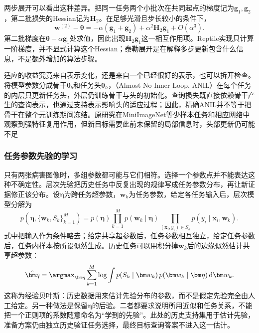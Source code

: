 两步展开可以看出这种差异。把同一任务两个小批次在共同起点的梯度记为$\bm g_1,\bm g_2$，第二批损失的Hessian记为$\bm H_2$。在足够光滑且步长较小的条件下，
\[
  \bm w^{(2)}-\bm{\theta}
    =-\alpha(\bm g_1+\bm g_2)
      +\alpha^2\bm H_2\bm g_1+O(\alpha^3).
\]
第二批梯度在$\bm{\theta}-\alpha\bm g_1$处求值，因此出现$\bm H_2\bm g_1$这一相互作用项。Reptile实现只计算一阶梯度，并不显式计算这个Hessian；泰勒展开是在解释多步更新包含什么信息，不是额外增加的算法步骤。

适应的收益究竟来自表示变化，还是来自一个已经很好的表示，也可以拆开检查。将模型参数分成骨干$\bm{\theta}_b$和任务头$\bm{\theta}_h$，（Almost No Inner Loop, ANIL）在每个任务的内层只更新任务头，外层仍训练骨干与头的初始化。查询损失既直接依赖骨干产生的查询表示，也通过支持表示影响头的适应过程；因此，精确ANIL并不等于把骨干在整个元训练期间冻结。原研究在MiniImageNet等少样本任务和相应网络中观察到强特征复用作用，但新目标需要此前未保留的局部信息时，头部更新仍可能不足

\subsubsection{任务参数先验的学习}
\label{sec:ket-transfer-prior}

只有两张病害图像时，多组参数都可能与它们相符。选择一个参数点并不能表达这种不确定性。层次先验把历史任务中反复出现的规律写成任务参数分布，再让新证据修正该分布。设$\bm\eta$为跨任务超参数，$\bm w_k$为任务参数，给定各任务输入后，层次模型分解为
\begin{equation}
  p(\bm\eta,\{\bm w_k,S_k\}_{k=1}^{M})
   =p(\bm\eta)\prod_{k=1}^{M}
      p(\bm w_k\mid\bm\eta)
      \prod_{(\bm x_i,y_i)\in S_k}
      p(y_i\mid\bm x_i,\bm w_k).
  \label{eq:ket-transfer-hierarchical-model}
\end{equation}
式中把输入作为条件略去；给定共享超参数后，任务参数相互独立，给定任务参数后，任务内样本按所设似然生成。历史任务可以用积分掉$\bm w_k$后的边缘似然估计共享超参数：
\begin{equation}
  \hat{\bm\eta}
  =\argmax_{\bm\eta}\sum_{k=1}^{M}
     \log\int p(S_k\mid\bm w_k)\,
          p(\bm w_k\mid\bm\eta)\,\mathrm d\bm w_k.
  \label{eq:ket-transfer-empirical-bayes}
\end{equation}
这称为经验贝叶斯：历史数据用来估计先验分布的参数，而不是假定先验完全由人工给定。另一种做法是保留$\bm\eta$的后验。二者都要求说明所用近似和任务关系，不能把一个正则项的系数随意命名为“学到的先验”。此处的历史支持集用于估计先验，准备方案仍由独立历史验证任务选择，最终目标查询答案不进入这一估计。

